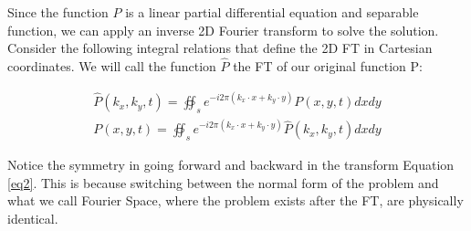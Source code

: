 Since the function $P$ is a linear partial differential equation and separable function, we can apply an inverse 2D Fourier transform to solve the solution. Consider the following integral relations that define the 2D FT in Cartesian coordinates. We will call the function $\hat{P}$ the FT of our original function P:

\begin{align*}  
  \hat{P}(k_x,k_y,t) =  \oiint_{s} e^{-i 2\pi (k_x \cdot x + k_y \cdot y )} P(x,y,t) dx dy \\  
  P(x,y,t) = \oiint_{s} e^{-i 2\pi (k_x \cdot x + k_y \cdot y )} \hat{P}(k_x,k_y,t) dx dy \tag{2}
  \label{eq2}  
\end{align*}  

Notice the symmetry in going forward and backward in the transform Equation \eqref{eq2}. This is because switching between the normal form of the problem and what we call Fourier Space, where the problem exists after the FT, are physically identical. 

